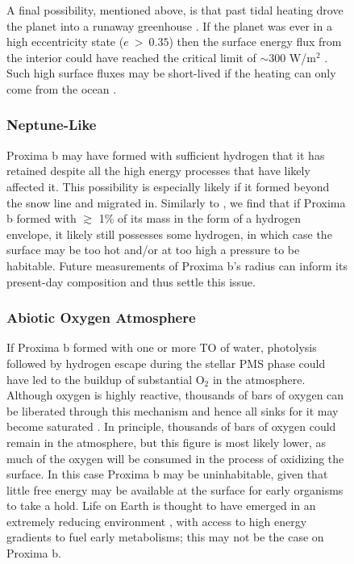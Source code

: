 \documentclass[preprint,12pt]{aastex}
\begin{document}
\begin{figure}
A final possibility, mentioned above, is that past tidal heating drove
the planet into a runaway greenhouse \citep{Barnes13}. If the planet
was ever in a high eccentricity state ($e~>~0.35$) then the surface
energy flux from the interior could have reached the critical limit of
$\sim$300 W/m$^2$ \citep{Kasting93,Abe93,Goldblatt15}. Such high
surface fluxes may be short-lived if the heating can only come from
the ocean \citep{DriscollBarnes15}.

\subsubsection{Neptune-Like}
\label{sec:results:atmstates:neptunelike}

Proxima b may have formed with sufficient hydrogen that it has
retained despite all the high energy processes that have likely
affected it. This possibility is especially likely if it formed beyond
the snow line and migrated in. Similarly to \cite{OwenMohanty16}, we find
that if Proxima b formed with $\gtrsim$ 1\% of its mass in the form of a 
hydrogen envelope, it likely still possesses some hydrogen, in which case
the surface may be too hot and/or at too high a pressure to be habitable.
Future measurements of Proxima b's radius can inform its present-day
composition and thus settle this issue.

\subsubsection{Abiotic Oxygen Atmosphere}
\label{sec:results:atmstates:o2atmos}

If Proxima b formed with one or more TO of water, photolysis followed
by hydrogen escape during the stellar PMS phase could have led to the 
buildup of substantial O$_2$ in the atmosphere. Although oxygen
is highly reactive, thousands of bars of oxygen can be liberated
through this mechanism \citep{LugerBarnes15} and hence all sinks for
it may become saturated \citep{Schaefer16}. In principle, thousands of
bars of oxygen could remain in the atmosphere, but this figure is most likely lower,
as much of the oxygen will be consumed in the process of oxidizing the surface. 
In this case Proxima b may be uninhabitable, given that little free energy
may be available at the surface for early organisms to take a hold. Life on
Earth is thought to have emerged in an extremely reducing environment
\citep{Oparin24, Haldane29}, with access to high energy gradients to fuel
early metabolisms; this may not be the case on Proxima b.


\end{figure}
\end{document}
